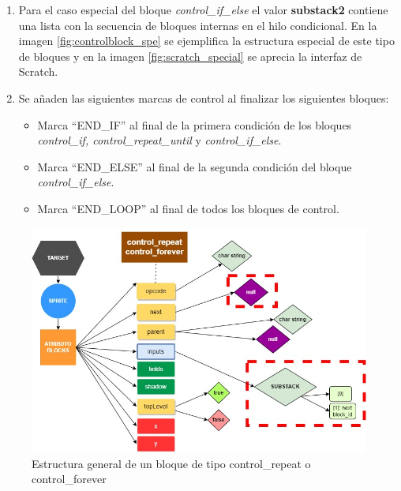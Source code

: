\documentclass[a4paper, 12pt]{book}
\begin{document}
\begin{enumerate}
\item Para el caso especial del bloque \textit{control\_if\_else} el valor \textbf{substack2} contiene una lista con la secuencia de bloques internas en el hilo condicional. En la imagen \ref{fig:controlblock_spe} se ejemplifica la estructura especial de este tipo de bloques y en la imagen \ref{fig:scratch_special} se aprecia la interfaz de Scratch.

\item Se añaden las siguientes marcas de control al finalizar los siguientes bloques:
\begin{itemize}
\item Marca ``END\_IF'' al final de la primera condición de los bloques \textit{control\_if, control\_repeat\_until} y \textit{control\_if\_else}.
\item Marca ``END\_ELSE'' al final de la segunda condición del bloque \textit{control\_if\_else}.
\item Marca ``END\_LOOP'' al final de todos los bloques de control.
\end{itemize}
\end{enumerate}

\begin{figure}
  \centering
  \includegraphics[width=15cm, keepaspectratio]{img/block_loop.jpg}
  \caption{Estructura general de un bloque de tipo control\_repeat o control\_forever}
  \label{fig:loopsforever}
\end{figure}
\end{document}
